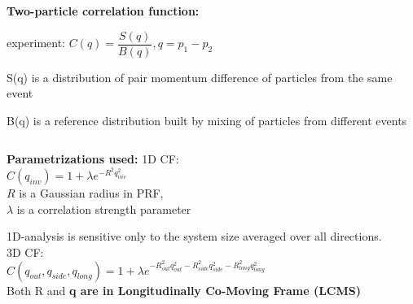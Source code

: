 \documentclass[dvipsnames] {beamer}
\begin{document}
\begin{frame}[shrink=40]
\begin{columns}[c]
\begin{block}{{\bf \centering Two-particle correlation function:}}
\begin{center}
{                experiment: $C(q) = \dfrac{S(q)}{B(q)}, q = p_{1} - p_{2}$
                
                \alert {S(q)} is a distribution of pair momentum difference of particles from the same event
                
                \alert {B(q)} is a reference distribution built by mixing of particles from different events}
            \end{center}
          \end{block}
        \end{columns}
        \vskip -0.1cm
        \begin{columns}[t]
          \begin{block}{\bf \centering Parametrizations used:}
            \centering 1D CF: \\
            \centering $C(q_{inv}) = 1 + \lambda e^{-R^{2} q_{inv}^{2}}$ \\
            $R$ is a Gaussian radius in PRF, \\
            $\lambda$ is a correlation strength parameter

            {\alert{1D-analysis}} is sensitive only to the system size averaged over all directions.\\
            \centering 3D CF: \\
            \centering $C(q_{out}, q_{side}, q_{long}) = 1 + \lambda e^{-R_{out}^{2}q_{out}^{2} - R_{side}^{2}q_{side}^{2} - R_{long}^{2}q_{long}^{2}}$ \\
            Both R and \bf{q}  are in Longitudinally Co-Moving Frame (LCMS) \\
                        

\end{block}
\end{columns}
\end{frame}
\end{document}

